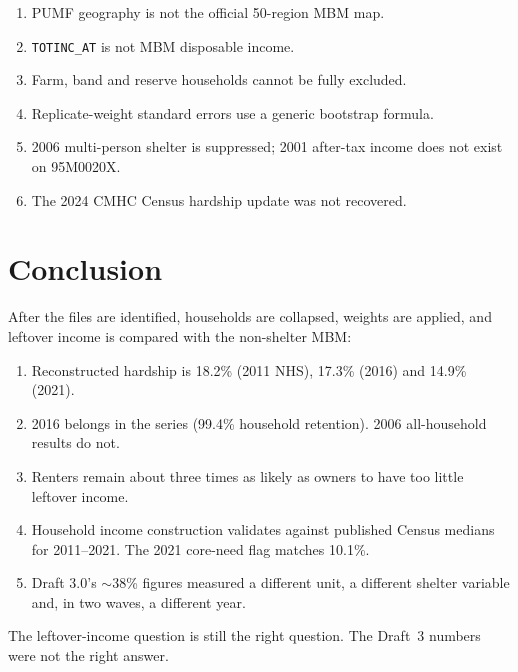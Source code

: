 \documentclass[11pt,letterpaper]{article}
\begin{document}
\begin{enumerate}[leftmargin=1.6em]
  \item PUMF geography is not the official 50-region MBM map.
  \item \texttt{TOTINC\_AT} is not MBM disposable income.
  \item Farm, band and reserve households cannot be fully excluded.
  \item Replicate-weight standard errors use a generic bootstrap formula.
  \item 2006 multi-person shelter is suppressed; 2001 after-tax income does not exist on 95M0020X.
  \item The 2024 CMHC Census hardship update was not recovered.
\end{enumerate}

\section{Conclusion}
\label{sec:conclusion}

After the files are identified, households are collapsed, weights are applied, and leftover income is compared with the non-shelter MBM:

\begin{enumerate}[leftmargin=1.6em]
  \item Reconstructed hardship is 18.2\% (2011 NHS), 17.3\% (2016) and 14.9\% (2021).
  \item 2016 belongs in the series (99.4\% household retention). 2006 all-household results do not.
  \item Renters remain about three times as likely as owners to have too little leftover income.
  \item Household income construction validates against published Census medians for 2011--2021. The 2021 core-need flag matches 10.1\%.
  \item Draft 3.0's $\sim$38\% figures measured a different unit, a different shelter variable and, in two waves, a different year.
\end{enumerate}

The leftover-income question is still the right question.
The Draft~3 numbers were not the right answer.
\end{document}
